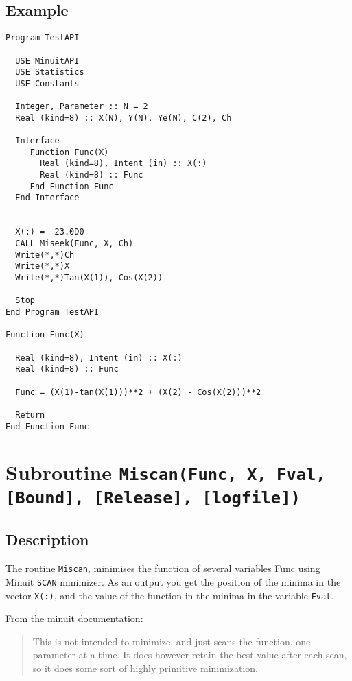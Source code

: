 \subsection{Example}

\begin{lstlisting}[emph=Minimize,
                   emphstyle=\color{blue},
                   frame=trBL,
                   caption=Using minuit library to minimize a function.,
                   label=minimize]
Program TestAPI

  USE MinuitAPI
  USE Statistics
  USE Constants

  Integer, Parameter :: N = 2
  Real (kind=8) :: X(N), Y(N), Ye(N), C(2), Ch

  Interface 
     Function Func(X)
       Real (kind=8), Intent (in) :: X(:)
       Real (kind=8) :: Func
     End Function Func
  End Interface
  

  X(:) = -23.0D0
  CALL Miseek(Func, X, Ch)
  Write(*,*)Ch
  Write(*,*)X
  Write(*,*)Tan(X(1)), Cos(X(2))

  Stop
End Program TestAPI

Function Func(X)

  Real (kind=8), Intent (in) :: X(:)
  Real (kind=8) :: Func

  Func = (X(1)-tan(X(1)))**2 + (X(2) - Cos(X(2)))**2

  Return
End Function Func
\end{lstlisting}


\section{Subroutine \texttt{Miscan(Func, X, Fval, [Bound], [Release], [logfile]) }}

\subsection{Description}

The routine \texttt{Miscan}, minimises the function of several
variables Func using Minuit \texttt{SCAN} minimizer. As an output
you get the position of the minima in the 
vector \texttt{X(:)}, and the value of the function in the minima in
the variable \texttt{Fval}. 

From the minuit documentation:
\begin{quotation}
  This is not intended to minimize, and just scans the function, one
  parameter at a time. It does however retain the best value after
  each scan, so it does some sort of highly primitive minimization. 
\end{quotation}

